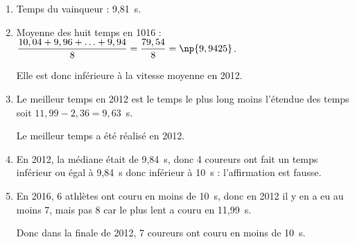 \begin{enumerate}
\item %
Temps du vainqueur : 9,81~s.
\item %
Moyenne des huit temps en 1016 : $\dfrac{10,04 + 9,96 + \ldots + 9,94}{8} = \dfrac{79,54}{8} = \np{9,9425}$.

Elle est donc inférieure à la vitesse moyenne en 2012.
\item %
Le meilleur temps en 2012 est le temps le plus long moins l'étendue des temps soit $11,99 - 2,36 = 9,63$~s.

Le meilleur temps a été réalisé en 2012.
\item %

En 2012, la médiane était de 9,84~s, donc 4 coureurs ont fait un temps inférieur ou égal à 9,84~s donc inférieur à 10~s : l'affirmation est fausse.
\item %

En 2016, 6 athlètes ont couru en moins de 10~s, donc en 2012 il y en a eu au moins 7, mais pas 8 car le plus lent a couru en 11,99~s.

Donc dans la finale de 2012, 7 coureurs ont couru en moins de 10~s.
\end{enumerate}

\medskip

